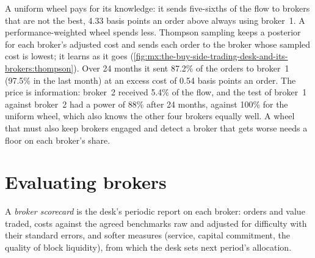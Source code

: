 A uniform wheel pays for its knowledge: it sends five-sixths of the flow to brokers that are not the best, 4.33 basis points an order above always
using broker~1. A performance-weighted wheel spends less. Thompson sampling keeps a posterior for each broker's adjusted cost and sends each order to
the broker whose sampled cost is lowest; it learns as it goes (\cref{fig:mx:the-buy-side-trading-desk-and-its-brokers:thompson}). Over 24 months it
sent 87.2\% of the orders to broker~1 (97.5\% in the last month) at an excess cost of 0.54 basis points an order. The price is information: broker~2
received 5.4\% of the flow, and the test of broker~1 against broker~2 had a power of 88\% after 24 months, against 100\% for the uniform wheel, which
also knows the other four brokers equally well. A wheel that must also keep brokers engaged and detect a broker that gets worse needs a floor on each
broker's share.

\begin{omfigure}

\label{fig:mx:the-buy-side-trading-desk-and-its-brokers:thompson}
\end{omfigure}

\section{Evaluating brokers}

\begin{definition}\label{def:mx:the-buy-side-trading-desk-and-its-brokers:scorecard}
A \emph{broker scorecard} is the desk's periodic report on each broker: orders and value traded, costs against the agreed
benchmarks raw and adjusted for difficulty with their standard errors, and softer measures (service, capital commitment, the quality of block
liquidity), from which the desk sets next period's allocation.
\end{definition}

